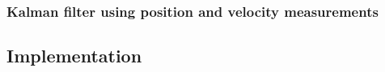 \documentclass[11pt]{article}
\begin{document}

\subsubsection{Kalman filter using position and velocity measurements}
\label{subsubsec:fullKalmanFilter}


\subsection{Implementation}
\label{subsec:partB_implementation}


%
%
%
%
%
\end{document}
